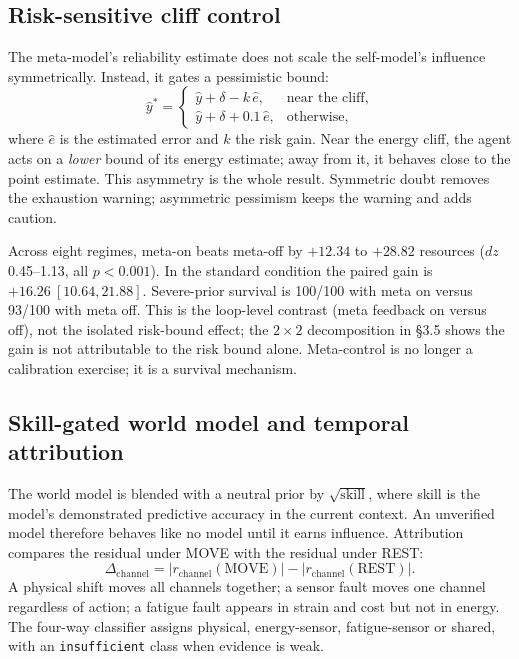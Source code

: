 \documentclass{article}
\begin{document}
\subsection{Risk-sensitive cliff control}

The meta-model's reliability estimate does not scale the self-model's influence symmetrically. Instead, it gates a pessimistic bound:
\begin{equation}
\hat{y}^{*} =
\begin{cases}
\hat{y} + \delta - k\,\hat{e}, & \text{near the cliff},\\[2pt]
\hat{y} + \delta + 0.1\,\hat{e}, & \text{otherwise},
\end{cases}
\end{equation}
where $\hat{e}$ is the estimated error and $k$ the risk gain. Near the energy cliff, the agent acts on a \emph{lower} bound of its energy estimate; away from it, it behaves close to the point estimate. This asymmetry is the whole result. Symmetric doubt removes the exhaustion warning; asymmetric pessimism keeps the warning and adds caution.

Across eight regimes, meta-on beats meta-off by $\mathbf{+12.34}$ to $\mathbf{+28.82}$ resources ($dz$ 0.45--1.13, all $p<0.001$). In the standard condition the paired gain is $\mathbf{+16.26\ [10.64,21.88]}$. Severe-prior survival is 100/100 with meta on versus 93/100 with meta off. This is the loop-level contrast (meta feedback on versus off), not the isolated risk-bound effect; the $2\times2$ decomposition in \S3.5 shows the gain is not attributable to the risk bound alone. Meta-control is no longer a calibration exercise; it is a survival mechanism.

\subsection{Skill-gated world model and temporal attribution}

The world model is blended with a neutral prior by $\sqrt{\mathrm{skill}}$, where skill is the model's demonstrated predictive accuracy in the current context. An unverified model therefore behaves like no model until it earns influence. Attribution compares the residual under MOVE with the residual under REST:
\begin{equation}
\Delta_{\mathrm{channel}} = \bigl|r_{\mathrm{channel}}(\mathrm{MOVE})\bigr| - \bigl|r_{\mathrm{channel}}(\mathrm{REST})\bigr|.
\end{equation}
A physical shift moves all channels together; a sensor fault moves one channel regardless of action; a fatigue fault appears in strain and cost but not in energy. The four-way classifier assigns physical, energy-sensor, fatigue-sensor or shared, with an \texttt{insufficient} class when evidence is weak.
\end{document}
